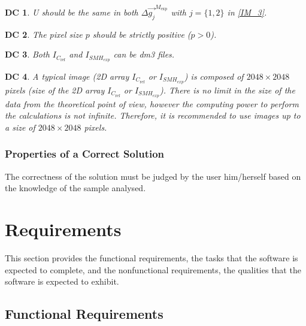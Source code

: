 \documentclass[12pt]{article}
\newtheorem{DC}{DC}
\begin{document}
\begin{DC}
\label{DC_1}
\normalfont U should be the same in both $\Delta \overrightarrow{g_{j}}^{M_{\text{exp}}}$ with $j=\{1,2\}$ in \cref{IM_3}.
\end{DC}    
\begin{DC}
\label{DC_2}
\normalfont The pixel size $p$ should be strictly positive ($p>0$).
\end{DC}
\begin{DC}
\label{DC_3}
\normalfont Both $I_{\mathit{C}_{\text{ref}}}$ and $I_{\mathit{SMH_{\text{exp}}}}$ can be dm3 files.
\end{DC}
\begin{DC}
\label{DC_4}
\normalfont A typical image (2D array $I_{C_{\text{ref}}}$ or $I_{\mathit{SMH_{\text{exp}}}}$) is composed of $2048 \times 2048$ pixels (size of the 2D array $I_{C_{\text{ref}}}$ or $I_{\mathit{SMH_{\text{exp}}}}$). There is no limit in the size of the data from the theoretical point of view, however the computing power to perform the calculations is not infinite. Therefore, it is recommended to use images up to a size of $2048 \times 2048$ pixels.
\end{DC}

\subsubsection{Properties of a Correct Solution} \label{sec_CorrectSolution}

\noindent
The correctness of the solution must be judged by the user him/herself based on the knowledge of the sample analysed.

\section{Requirements}

This section provides the functional requirements, the tasks that the software is expected to complete, and the nonfunctional requirements, the qualities that the software is expected to exhibit.

\subsection{Functional Requirements}
\end{document}
